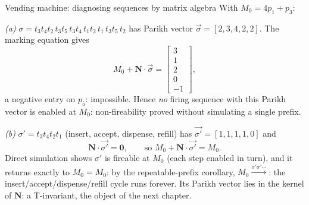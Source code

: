 \begin{examplebox}{Vending machine: diagnosing sequences by matrix algebra}
With $M_0 = 4p_1 + p_3$:
\par\smallskip
\emph{(a)} $\sigma = t_3 t_4 t_2\, t_3 t_5\, t_3 t_4\, t_1 t_2\, t_1\, t_3 t_5\, t_2$ has Parikh vector $\vec{\sigma} = [2, 3, 4, 2, 2]$. The marking equation gives
\[
M_0 + \mathbf{N} \cdot \vec{\sigma} = \begin{bmatrix} 3 \\ 1 \\ 2 \\ 0 \\ \boxed{-1} \end{bmatrix},
\]
a negative entry on $p_5$: impossible. Hence \emph{no} firing sequence with this Parikh vector is enabled at $M_0$: non-fireability proved without simulating a single prefix.
\par\smallskip
\emph{(b)} $\sigma' = t_3 t_4 t_2 t_1$ (insert, accept, dispense, refill) has $\vec{\sigma'} = [1, 1, 1, 1, 0]$ and
\[
\mathbf{N} \cdot \vec{\sigma'} = \mathbf{0}, \qquad \text{so } M_0 + \mathbf{N} \cdot \vec{\sigma'} = M_0.
\]
Direct simulation shows $\sigma'$ is fireable at $M_0$ (each step enabled in turn), and it returns exactly to $M_0 = M_0$: by the repeatable-prefix corollary, $M_0 \xrightarrow{\sigma' \sigma' \cdots}$: the insert/accept/dispense/refill cycle runs forever. Its Parikh vector lies in the kernel of $\mathbf{N}$: a T-invariant, the object of the next chapter.
\end{examplebox}
